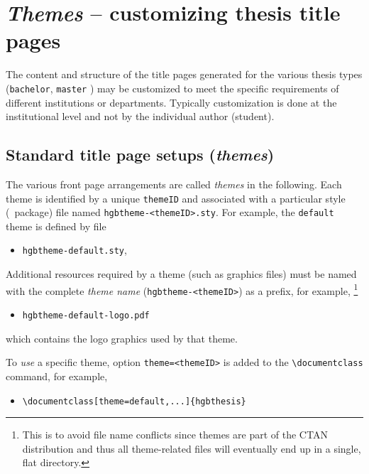 \documentclass[english]{hgbarticle}
\begin{document}
\section{\emph{Themes} -- customizing thesis title pages}
\label{sec:Themes}

The content and structure of the title pages generated for the various thesis types
(\texttt{bachelor}, \texttt{master} \etc) may be customized to meet the specific
requirements of different institutions or departments.
Typically customization is done at the institutional level and not
by the individual author (student).

\subsection{Standard title page setups (\emph{themes})}

The various front page arrangements are called \emph{themes} in the following.
Each theme is identified by a unique \texttt{themeID} and associated with a 
particular style (\latex\ package) file named \verb!hgbtheme-<themeID>.sty!.
For example, the \texttt{default} theme  is defined by file
\begin{itemize}
  \item[] \texttt{hgbtheme-default.sty},
\end{itemize}
%
Additional resources required by a theme (such as graphics files) must be named with the 
complete \emph{theme name} (\verb!hgbtheme-<themeID>!) as a prefix, for example,%
\footnote{This is to avoid file name conflicts since themes are part of the 
CTAN distribution and thus all theme-related files will eventually end up in a single, 
flat directory.}
\begin{itemize}
	\item[] \texttt{hgbtheme-default-logo.pdf}
\end{itemize}
%
which contains the logo graphics used by that theme.

To \emph{use} a specific theme, option \verb!theme=<themeID>! is added to the 
\verb!\documentclass! command, for example,
\begin{itemize}
	\item[] \verb!\documentclass[theme=default,...]{hgbthesis}!
\end{itemize}
\end{document}
